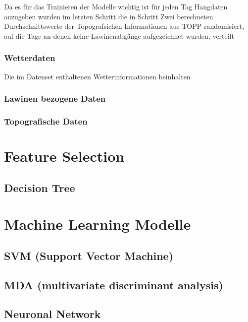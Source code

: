 \documentclass[12pt,a4paper]{article}
\begin{document}
Da es für das Trainieren der Modelle wichtig ist für jeden Tag Hangdaten anzugeben wurden im letzten Schritt die in Schritt Zwei berechneten Durchschnittswerte der Topografsichen Informationen aus TOPP randomisiert, auf die Tage an denen keine Lawinenabgänge aufgezeichnet wurden, verteilt
 

\subsubsection{Wetterdaten}
Die im Datenset enthaltenen Wetterinformationen beinhalten

\subsubsection{Lawinen bezogene Daten}

\subsubsection{Topografische Daten}

\section{Feature Selection}

\subsection{Decision Tree}

\section{Machine Learning Modelle}

\subsection{SVM (Support Vector Machine)}

\subsection{MDA (multivariate discriminant analysis)}

\subsection{Neuronal Network}











\newpage
{}
\printbibliography
\end{document}
